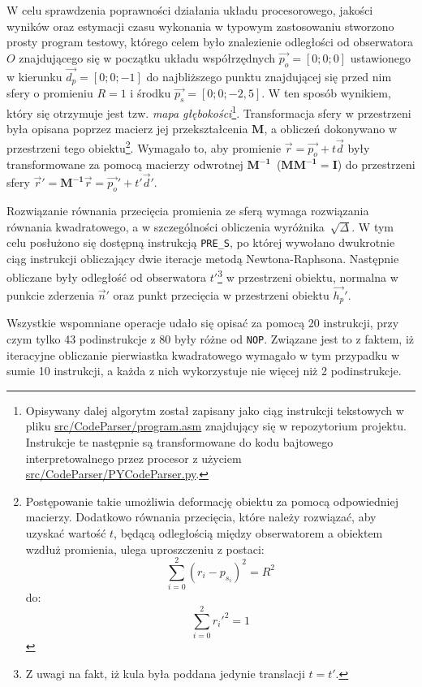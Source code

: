 \begin{enumerate}
\end{enumerate}

W celu sprawdzenia poprawności działania układu procesorowego, jakości wyników oraz estymacji czasu wykonania w typowym zastosowaniu stworzono prosty program testowy, którego celem było znalezienie odległości od obserwatora $O$ znajdującego się w początku układu współrzędnych $\vec{p_o} = [0; 0; 0]$ ustawionego w kierunku $\vec{d_p} = [0; 0; -1]$ do najbliższego punktu znajdującej się przed nim sfery o promieniu $R = 1$ i środku $\vec{p_s} = [0; 0; -2,5]$. W ten sposób wynikiem, który się otrzymuje jest tzw. \textit{mapa głębokości}\footnote{Opisywany dalej algorytm został zapisany jako ciąg instrukcji tekstowych w pliku \url{src/CodeParser/program.asm} znajdujący się w repozytorium projektu. Instrukcje te następnie są transformowane do kodu bajtowego interpretowalnego przez procesor z użyciem \url{src/CodeParser/PYCodeParser.py}.}. Transformacja sfery w przestrzeni była opisana poprzez macierz jej przekształcenia $\mathbf{M}$, a obliczeń dokonywano w przestrzeni tego obiektu\footnote{Postępowanie takie umożliwia deformację obiektu za pomocą odpowiedniej macierzy. Dodatkowo równania przecięcia, które należy rozwiązać, aby uzyskać wartość $t$, będącą odległością między obserwatorem a obiektem wzdłuż promienia, ulega uproszczeniu z postaci:
\begin{equation*}
\sum_{i=0}^2\left(r_i - p_{s_i} \right)^2 = R^2
\end{equation*}
do:
\begin{equation*}
\sum_{i=0}^2 r_i'^2 = 1
\end{equation*}

}. Wymagało to, aby promienie $\vec{r} = \vec{p_o} + t\vec{d}$ były transformowane za pomocą macierzy odwrotnej $\mathbf{M^{-1}}$~($\mathbf{MM^{-1} = I}$) do przestrzeni sfery $\vec{r}' = \mathbf{M^{-1}}\vec{r} = \vec{p_o}' + t'\vec{d}'$. 

Rozwiązanie równania przecięcia promienia ze sferą wymaga rozwiązania równania kwadratowego, a w szczególności obliczenia wyróżnika~$\sqrt{\Delta}$. W tym celu posłużono się  dostępną instrukcją \texttt{PRE\_S}, po której wywołano dwukrotnie ciąg instrukcji obliczający dwie iteracje metodą Newtona-Raphsona. Następnie obliczane były odległość od obserwatora $t'$\footnote{Z uwagi na fakt, iż kula była poddana jedynie translacji $t = t'$.} w przestrzeni obiektu, normalna w punkcie zderzenia $\vec{n}'$ oraz punkt przecięcia w przestrzeni obiektu $\vec{h_p}'$.

Wszystkie wspomniane operacje udało się opisać za pomocą 20 instrukcji, przy czym tylko 43 podinstrukcje z 80 były różne od \texttt{NOP}. Związane jest to z faktem, iż iteracyjne obliczanie pierwiastka kwadratowego wymagało w tym przypadku w sumie 10 instrukcji, a każda z nich wykorzystuje nie więcej niż 2 podinstrukcje. 

